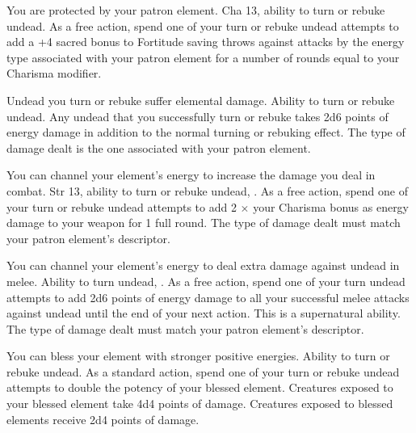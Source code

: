 
{You are protected by your patron element.}
{Cha 13, ability to turn or rebuke undead.}
{As a free action, spend one of your turn or rebuke undead attempts to add a +4 sacred bonus to Fortitude saving throws against attacks by the energy type associated with your patron element for a number of rounds equal to your Charisma modifier.}
{}{}

{Undead you turn or rebuke suffer elemental damage.}
{Ability to turn or rebuke undead.}
{Any undead that you successfully turn or rebuke takes 2d6 points of energy damage in addition to the normal turning or rebuking effect. The type of damage dealt is the one associated with your patron element.}
{}{}

{You can channel your element's energy to increase the damage you deal in combat.}
{Str 13, ability to turn or rebuke undead, .}
{As a free action, spend one of your turn or rebuke undead attempts to add 2 $\times$ your Charisma bonus as energy damage to your weapon for 1 full round. The type of damage dealt must match your patron element's descriptor.}
{}{}

{You can channel your element's energy to deal extra damage against undead in melee.}
{Ability to turn undead, .}
{As a free action, spend one of your turn undead attempts to add 2d6 points of energy damage to all your successful melee attacks against undead until the end of your next action. This is a supernatural ability. The type of damage dealt must match your patron element's descriptor.}
{}{}

{You can bless your element with stronger positive energies.}
{Ability to turn or rebuke undead.}
{As a standard action, spend one of your turn or rebuke undead attempts to double the potency of your blessed element. Creatures exposed to your blessed element take 4d4 points of damage.}
{Creatures exposed to blessed elements receive 2d4 points of damage.}
{}